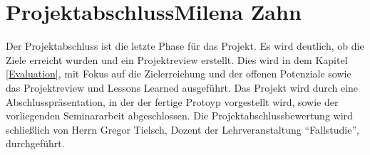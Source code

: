 	\section[Projektabschluss]{Projektabschluss{\hfill \normalsize Milena Zahn}} 
	Der Projektabschluss ist die letzte Phase für das Projekt. Es wird deutlich, ob die Ziele erreicht wurden und ein Projektreview erstellt. Dies wird in dem Kapitel \vref{Evaluation}, mit Fokus auf die Zielerreichung und der offenen Potenziale sowie das Projektreview und Lessons Learned ausgeführt. Das Projekt wird durch eine Abschlusspräsentation, in der der fertige Protoyp vorgestellt wird, sowie der vorliegenden Seminararbeit abgeschlossen. Die Projektabschlussbewertung wird schließlich von Herrn Gregor Tielsch, Dozent der Lehrveranstaltung \enquote{Fallstudie}, durchgeführt.